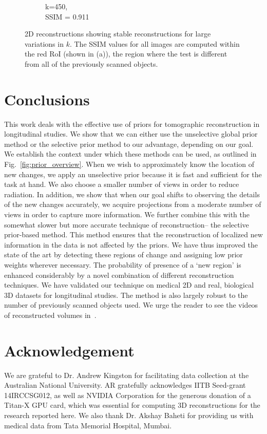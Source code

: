 \documentclass[journal]{IEEEtran}
\begin{document}
\begin{figure}[h]
\begin{subfigure}[b]{0.24\linewidth}
        \caption{k=450,\\ SSIM = 0.911}
     \end{subfigure}
    \caption{2D reconstructions showing stable reconstructions for large variations in $k$. The SSIM values for all images are computed within the red RoI (shown in (a)), the region where the test is different from all of the previously scanned objects.}
\label{fig:reconstructions_as_k_varies}
\end{figure}


\section{Conclusions}
\label{sec:conclusions}
This work deals with the effective use of priors for tomographic reconstruction in longitudinal studies. We show that we can either use the unselective global prior method or the selective prior method to our advantage, depending on our goal. We establish the context under which these methods can be used, as outlined in Fig.~\ref{fig:prior_overview}. When we wish to approximately know the location of new changes, we apply an unselective prior because it is fast and sufficient for the task at hand. We also choose a smaller number of views in order to reduce radiation. In addition, we show that when our goal shifts to observing the details of the new changes accurately, we acquire projections from a moderate number of views in order to capture more information. We further combine this with the somewhat slower but more accurate technique of reconstruction-- the selective prior-based method. This method ensures that the reconstruction of localized new information in the data is not affected by the priors. We have thus improved the state of the art by detecting these regions of change and assigning low prior weights wherever necessary. The probability of presence of a `new region' is enhanced considerably by a novel combination of different reconstruction techniques.  We have validated our technique on medical 2D and real, biological 3D datasets for longitudinal studies. The method is also largely robust to the number of previously scanned objects used. We urge the reader to see the videos of reconstructed volumes in~\cite{supp_paper}. 

\section{Acknowledgement}
We are grateful to Dr. Andrew Kingston for facilitating data collection at the  Australian National University. AR gratefully acknowledges IITB Seed-grant 14IRCCSG012, as well as NVIDIA Corporation for the generous donation of a Titan-X GPU card, which was essential for computing 3D reconstructions for the research reported here. We also thank Dr. Akshay Baheti for providing us with medical data from Tata Memorial Hospital, Mumbai. 
{%
}
\end{document}
